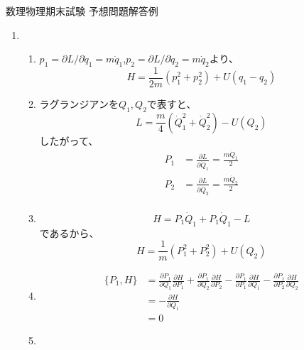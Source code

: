 \documentclass{jsarticle}
\begin{document}
\begin{center}
  {\huge 数理物理期末試験 予想問題解答例}\\
\end{center}

\begin{enumerate}
  \item
        \begin{enumerate}
          \item $p_1 = \partial L/\partial \dot{q}_1 = m\dot{q}_1$,$p_2 = \partial L/\partial \dot{q}_2 = m\dot{q}_2$より、
                $$
                  H = \frac{1}{2m}(p_1^2+p_2^2) + U(q_1-q_2)
                $$
          \item ラグランジアンを$Q_1, Q_2$で表すと、
                $$
                  L = \frac{m}{4}(\dot{Q}_1^2+\dot{Q}_2^2) - U(Q_2)
                $$
                したがって、
                $$
                  \begin{aligned}
                    P_1 & = \frac{\partial L}{\partial \dot{Q}_1} = \frac{m \dot{Q}_1}{2} \\
                    P_2 & = \frac{\partial L}{\partial \dot{Q}_2} = \frac{m \dot{Q}_2}{2} \\
                  \end{aligned}
                $$
          \item
                $$
                  H = P_1 \dot{Q}_1 + P_1 \dot{Q}_1 - L
                $$
                であるから、
                $$
                  H = \frac{1}{m}(P_1^2+P_2^2) + U(Q_2)
                $$
          \item
                $$
                  \begin{aligned}
                    \{P_1, H\} & = \frac{\partial P_1}{\partial Q_1}\frac{\partial H}{\partial P_1}
                    +\frac{\partial P_1}{\partial Q_2}\frac{\partial H}{\partial P_2}
                    - \frac{\partial P_1}{\partial P_1}\frac{\partial H}{\partial Q_1}
                    - \frac{\partial P_1}{\partial P_2}\frac{\partial H}{\partial Q_2}              \\
                               & = - \frac{\partial H}{\partial Q_1}                                \\
                               & = 0
                  \end{aligned}
                $$
          \item
                $$
                  \begin{aligned}

\end{aligned}$$
\end{enumerate}
\end{enumerate}
\end{document}
